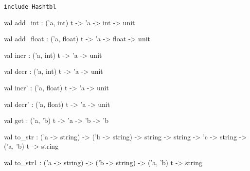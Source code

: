 \documentclass[11pt]{article}
\begin{document}
\begin{ocamldocsigend}


{\tt{include }}{\tt{Hashtbl}}

\label{val:Util.Ht.add-underscoreint}\begin{ocamldoccode}
val add_int : ('a, int) t -> 'a -> int -> unit
\end{ocamldoccode}


\label{val:Util.Ht.add-underscorefloat}\begin{ocamldoccode}
val add_float : ('a, float) t -> 'a -> float -> unit
\end{ocamldoccode}


\label{val:Util.Ht.incr}\begin{ocamldoccode}
val incr : ('a, int) t -> 'a -> unit
\end{ocamldoccode}


\label{val:Util.Ht.decr}\begin{ocamldoccode}
val decr : ('a, int) t -> 'a -> unit
\end{ocamldoccode}


\label{val:Util.Ht.incr'}\begin{ocamldoccode}
val incr' : ('a, float) t -> 'a -> unit
\end{ocamldoccode}


\label{val:Util.Ht.decr'}\begin{ocamldoccode}
val decr' : ('a, float) t -> 'a -> unit
\end{ocamldoccode}


\label{val:Util.Ht.get}\begin{ocamldoccode}
val get : ('a, 'b) t -> 'a -> 'b -> 'b
\end{ocamldoccode}


\label{val:Util.Ht.to-underscorestr}\begin{ocamldoccode}
val to_str :
  ('a -> string) ->
  ('b -> string) -> string -> string -> 'c -> string -> ('a, 'b) t -> string
\end{ocamldoccode}


\label{val:Util.Ht.to-underscorestr1}\begin{ocamldoccode}
val to_str1 : ('a -> string) -> ('b -> string) -> ('a, 'b) t -> string
\end{ocamldoccode}



\end{ocamldocsigend}
\end{document}
